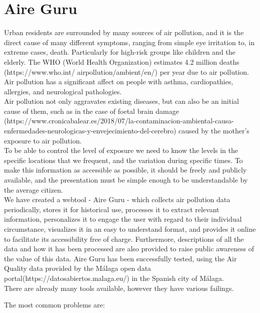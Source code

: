 \section{Aire Guru}

Urban residents are surrounded by many sources of air pollution, and it is the direct cause of many different symptoms,
ranging from simple eye irritation 
to, in extreme cases, death. Particularly for high-risk groups like children and the elderly.
The WHO (World Health Organization) estimates 4.2 million deaths
(https://www.who.int/
airpollution/ambient/en/) per year due to air pollution.
Air pollution has a significant affect on people with asthma, cardiopathies, allergies, and neurological pathologies.\\


Air pollution not only aggravates existing diseases, but can also be an initial cause of them, such as in the case of foetal brain
damage (https://www.cronicabalear.es/2018/07/la-contaminacion-ambiental-causa-enfermedades-neurologicas-y-envejecimiento-del-cerebro)
caused by the mother's exposure to air pollution.\\


To be able to control the level of exposure we need to know the levels
in the specific locations that we frequent, and the variation during specific times.
To make this information as accessible as possible, it should be freely and publicly available, and the presentation
must be simple enough to be understandable by the average citizen.\\


We have created a webtool - Aire Guru - which collects air pollution data periodically, stores it for historical use, 
processes it to extract relevant information, personalizes it to engage the user with regard to their individual
circumstance, visualizes it in an easy to understand format, and provides it online to facilitate its accessibility free of charge. Furthermore,
descriptions of all the data and how it has been processed are also provided to raise public awareness of the value
of this data. Aire Guru has been successfully tested, using the Air Quality data provided
by the Málaga open data portal(https://datosabiertos.malaga.eu/) in the Spanish city of Málaga.\\


There are already many tools available, however they have various failings.

The most common problems are:

